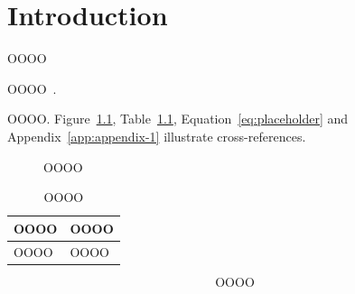 \chapter{Introduction}
\label{chap:chapter-1}

OOOO

OOOO~\cite{placeholder-one,placeholder-two,placeholder-three}.

OOOO. Figure~\ref{fig:placeholder}, Table~\ref{tab:placeholder},
Equation~\ref{eq:placeholder} and Appendix~\ref{app:appendix-1}
illustrate cross-references.

\begin{figure}[tbp]
  \centering
  
  \caption[OOOO]{OOOO}
  \label{fig:placeholder}
\end{figure}

\begin{table}[tbp]
  \centering
  \caption[OOOO]{OOOO}
  \label{tab:placeholder}
  \begin{tabular}{ll}
    \toprule
    OOOO & OOOO \\
    \midrule
    OOOO & OOOO \\
    \bottomrule
  \end{tabular}
\end{table}

\begin{equation}
  \mathrm{OOOO}
  \label{eq:placeholder}
\end{equation}
